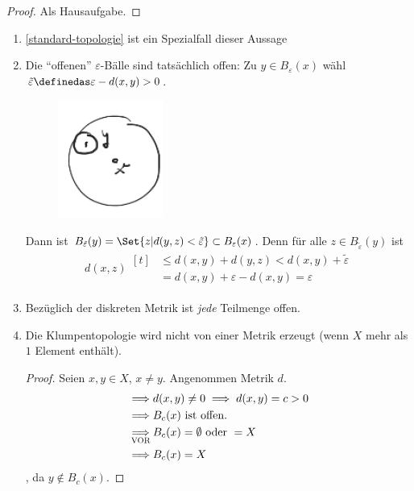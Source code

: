 \begin{proof}
    Als Hausaufgabe.    
\end{proof}
\begin{bemerkungen}
    \begin{enumerate}
        \item \ref{standard-topologie} ist ein Spezialfall dieser Aussage
        \item Die \enquote{offenen} \( \varepsilon \)-Bälle sind tatsächlich offen: Zu \( y\in B_\varepsilon(x) \) wähl \( \tilde{\varepsilon}\definedas \varepsilon-d(x,y)>0 \).
        \begin{figure}[H]
            \centering
            \includegraphics[width=0.3\linewidth]{figures/offene_baelle_sind_offen}
            \label{fig:offene_baelle_sind_offen}
        \end{figure}
        Dann ist \( B_{\tilde{\varepsilon}}(y)=\Set{z|d(y,z)<\tilde{\varepsilon}} \subset B_\varepsilon(x)\). Denn für alle \( z\in B_{\tilde{\varepsilon}}(y) \) ist
        \begin{align*}
            d(x,z)\begin{aligned}[t] 
                &\leq d(x,y)+d(y,z)<d(x,y)+\tilde{\varepsilon}\\
                &=d(x,y)+\varepsilon-d(x,y)=\varepsilon
            \end{aligned}
        \end{align*}
        
        \item Bezüglich der diskreten Metrik ist \emph{jede} Teilmenge offen.
        \item Die Klumpentopologie wird nicht von einer Metrik erzeugt (wenn \( X \) mehr als \( 1 \) Element enthält).
        \begin{proof}
            Seien \( x,y\in X \), \( x\neq y \). Angenommen \texists Metrik \( d \).
            \begin{align*}
                \implies &d(x,y)\neq 0\implies d(x,y)=c>0\\
                \implies &B_c(x)\text{ ist offen.}\\
                \underset{\text{\scshape{VOR}}}{\implies} &B_c(x)=\emptyset \text{ oder } =X\\
                \implies &B_c(x)=X
            \end{align*}
            \contra, da \( y\notin B_c(x) \).
            

\end{proof}
\end{enumerate}
\end{bemerkungen}
